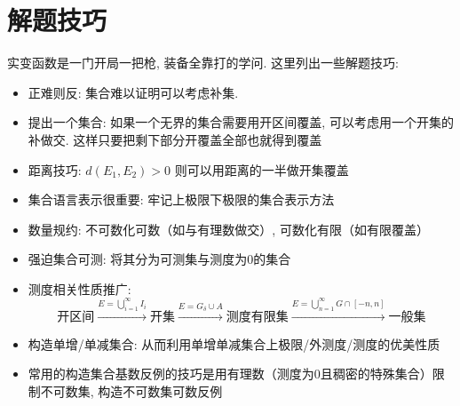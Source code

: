 \section{解题技巧}
实变函数是一门开局一把枪, 装备全靠打的学问. 这里列出一些解题技巧:
\begin{itemize}
    \item 正难则反: 集合难以证明可以考虑补集.
    \item 提出一个集合: 如果一个无界的集合需要用开区间覆盖, 可以考虑用一个开集的补做交.
        这样只要把剩下部分开覆盖全部也就得到覆盖
    \item 距离技巧: \(d(E_{1},E_{2})>0\) 则可以用距离的一半做开集覆盖
    \item 集合语言表示很重要: 牢记上极限下极限的集合表示方法
    \item 数量规约: 不可数化可数（如与有理数做交）, 可数化有限（如有限覆盖）
    \item 强迫集合可测: 将其分为可测集与测度为0的集合
    \item 测度相关性质推广: \[
            \text{开区间}
            \xrightarrow{E=\bigcup_{i=1}^{\infty} I_{i}}
            \text{开集} \xrightarrow{E=G_{\delta} \cup A}
            \text{测度有限集}
            \xrightarrow{E=\bigcup_{n=1}^{\infty} G\cap
            [-n,n]} \text{一般集}
        \]
    \item 构造单增/单减集合: 从而利用单增单减集合上极限/外测度/测度的优美性质
    \item 常用的构造集合基数反例的技巧是用有理数（测度为0且稠密的特殊集合）限制不可数集, 构造不可数集可数反例
\end{itemize}

